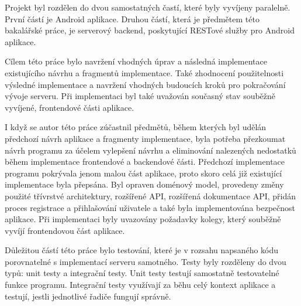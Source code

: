 Projekt byl rozdělen do dvou samostatných častí, které byly vyvíjeny paralelně. První částí je Android aplikace. Druhou částí, která je předmětem této bakalářské práce, je serverový backend, poskytující RESTové služby pro Android aplikace.

Cílem této práce bylo navržení vhodných úprav a následná implementace existujícího návrhu a fragmentů implementace. Také zhodnocení použitelnosti výsledné implementace a navržení vhodných budoucích kroků pro pokračování vývoje serveru. Při implementaci byl také uvažován současný stav souběžně vyvíjené, frontendové části aplikace.

I když se autor této práce zúčastnil předmětů, během kterých byl udělán předchozí návrh aplikace a fragmenty implementace, byla potřeba přezkoumat návrh programu za účelem vylepšení návrhu a eliminování nalezených nedostatků během implementace frontendové a backendové části. Předchozí implementace programu pokrývala jenom malou část aplikace, proto skoro celá již existující implementace byla přepsána. Byl opraven doménový model, provedeny změny použité třívrstvé architektury, rozšířené API, rozšířená dokumentace API, přidán proces registrace a přihlašování uživatele a také byla implementována bezpečnost aplikace. Při implementaci byly uvazovány požadavky kolegy, který souběžně vyvíjí frontendovou část aplikace.

Důležitou částí této práce bylo testování, které je v rozsahu napsaného kódu porovnatelné s implementací serveru samotného. Testy byly rozděleny do dvou typů: unit testy a integrační testy. Unit testy testují samostatně testovatelné funkce programu. Integrační testy využívají za běhu celý kontext aplikace a testují, jestli jednotlivé řadiče fungují správně. 

